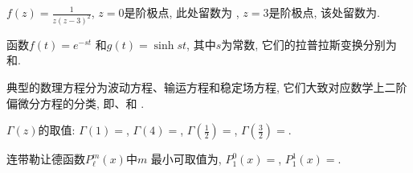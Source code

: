 \documentclass{njustexam}
\begin{document}
  \begin{problem}
  $f(z) = \frac{1}{z(z-3)^2}$, $z=0$是阶极点, 此处留数为 , $z=3$是阶极点, 
  该处留数为. 
  \end{problem}
  
  \begin{problem}
  函数$f(t) = e^{-st}$ 和$g(t)=\sinh{st}$, 其中$s$为常数, 
  它们的拉普拉斯变换分别为 和.
  \end{problem}
  
  \begin{problem}
  典型的数理方程分为波动方程、输运方程和稳定场方程, 
  它们大致对应数学上二阶偏微分方程的分类, 即、和 . 
  \end{problem}
  
  
  \begin{problem}
  $\Gamma(z)$的取值: $\Gamma(1)=$, 
  $\Gamma(4)=$, $\Gamma(\frac{1}{2})= $\fillout{$\sqrt{\pi}$},
  $\Gamma(\frac{3}{2}) = $.
  \end{problem}
  
 


\begin{problem}
连带勒让德函数$P_\ell^m(x)$中$m$%
最小可取值为\fillout{$-\ell$}, 
$P_1^0(x) = $,  $P_1^1(x) = $. 
\end{problem}



  
  
\end{document}
